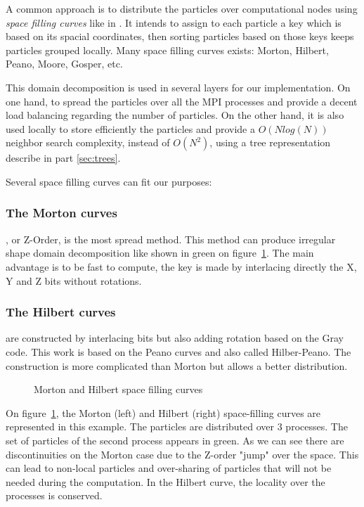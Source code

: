 A common approach is to distribute the particles over computational nodes using \textit{space filling curves} like in \cite{warren20132hot,springel2005cosmological,bedorf201424}. 
It intends to assign to each particle a key which is based on its spacial coordinates, then sorting particles based on those keys keeps particles grouped locally.
Many space filling curves exists: Morton, Hilbert, Peano, Moore, Gosper, etc.\

This domain decomposition is used in several layers for our implementation. 
On one hand, to spread the particles over all the MPI processes and provide a decent load balancing regarding the number of particles. 
On the other hand, it is also used locally to store efficiently the particles and provide a $O(N log(N))$ neighbor search complexity, instead of $O(N^2)$, using a tree representation describe in part \ref{sec:trees}. 

Several space filling curves can fit our purposes:
\subsubsection*{The Morton curves} \cite{morton1966computer}, or Z-Order, is the most spread method. 
This method can produce irregular shape domain decomposition like shown in green on figure~\ref{fig:space_filling}. 
The main advantage is to be fast to compute, the key is made by interlacing directly the X, Y and Z bits without rotations. 
\subsubsection*{The Hilbert curves} \cite{sagan2012space} are constructed by interlacing bits but also adding rotation based on the Gray code.
This work is based on the Peano curves and also called Hilber-Peano. 
The construction is more complicated than Morton but allows a better distribution. 

\begin{figure}[t!]
\centering

\caption{Morton and Hilbert space filling curves}
\label{fig:space_filling}
\end{figure}

On figure~\ref{fig:space_filling}, the Morton (left) and Hilbert (right) space-filling curves are represented in this example.
The particles are distributed over 3 processes. 
The set of particles of the second process appears in green. 
As we can see there are discontinuities on the Morton case due to the Z-order "jump" over the space. 
This can lead to non-local particles and over-sharing of particles that will not be needed during the computation.
In the Hilbert curve, the locality over the processes is conserved.

